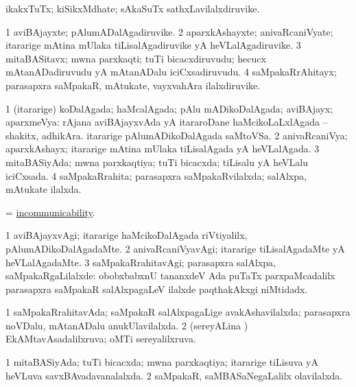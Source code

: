 \bentry
{}
\gl{\nA}
\bmng
ikakxTuTx; kiSikxMdhate; sAkaSuTx sathxLavilalxdiruvike. 
\emng
\eentry

\bentry
{}
\gl{\nA}
\bmng
\bnum
\num{1} aviBAjayxte; pAlumADalAgadiruvike. 
\num{2} aparxkAshayxte; anivaRcaniVyate; itararige mAtina mUlaka tiLisalAgadiruvike yA heVLalAgadiruvike. 
\num{3} mitaBASitavx; mwna parxkaqti; tuTi bicacxdiruvudu; hecucx mAtanADadiruvudu yA mAtanADalu iciCxsadiruvudu. 
\num{4} saMpakaRrAhitayx; parasapxra saMpakaR, mAtukate, vayxvahAra ilalxdiruvike. 
\enum
\emng
\eentry

\bentry
{}
\gl{\gu}
\bmng
\bnum
\num{1} (itararige) koDalAgada; haMcalAgada; pAlu mADikoDalAgada; aviBAjayx; aparxmeVya:  rAjana aviBAjayxvAda yA itararoDane haMcikoLaLxlAgada -- shakitx, adhikAra.  itararige pAlumADikoDalAgada saMtoVSa. 
\num{2} anivaRcaniVya; aparxkAshayx; itararige mAtina mUlaka tiLisalAgada yA heVLalAgada. 
\num{3} mitaBASiyAda; mwna parxkaqtiya; tuTi bicacxda; tiLisalu yA heVLalu iciCxsada. 
\num{4} saMpakaRrahita; parasapxra saMpakaRvilalxda; salAlxpa, mAtukate ilalxda. 
\enum
\emng
\eentry

\bentry
{}
\gl{\nA}
\bmng
 = \hyperlink{incommunicability}{incommunicability}. 
\emng
\eentry

\bentry
{}
\gl{\kirxvi}
\bmng
\bnum
\num{1} aviBAjayxvAgi; itararige haMcikoDalAgada riVtiyalilx, pAlumADikoDalAgadaMte. 
\num{2} anivaRcaniVyavAgi; itararige tiLisalAgadaMte yA heVLalAgadaMte. 
\num{3} saMpakaRrahitavAgi; parasapxra salAlxpa, saMpakaRgaLilalxde:  obobxbabxnU tananxdeV Ada puTaTx parxpaMcadalilx parasapxra saMpakaR salAlxpagaLeV ilalxde paqthakAkxgi niMtidadx. 
\enum
\emng
\eentry

\bentry
{}
\gl{\gu}
\bmng
\bnum
\num{1} saMpakaRrahitavAda; saMpakaR salAlxpagaLige avakAshavilalxda; parasapxra noVDalu, mAtanADalu anukUlavilalxda. 
\num{2} (sereyALina \vi) EkAMtavAsadalilxruva; oMTi sereyalilxruva. 
\enum
\emng
\eentry

\bentry
{}
\gl{\gu}
\bmng
\bnum
\num{1} mitaBASiyAda; tuTi bicacxda; mwna parxkaqtiya; itararige tiLisuva yA heVLuva savxBAvadavanalalxda. 
\num{2} saMpakaR, saMBASaNegaLalilx olavilalxda. 
\enum
\emng
\eentry

